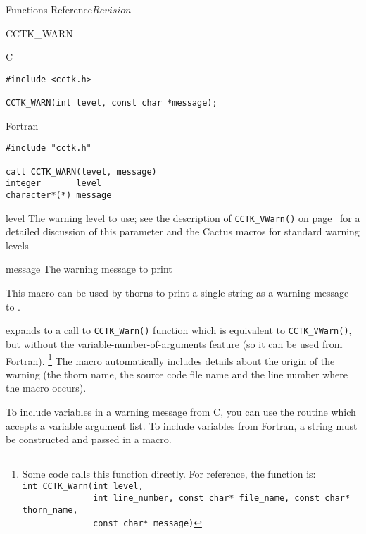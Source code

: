 \begin{cactuspart}{ Functions Reference}{}{$Revision$}
\begin{FunctionDescription}{CCTK\_WARN}
\begin{SynopsisSection}
\begin{Synopsis}{C}
\begin{verbatim}
#include <cctk.h>

CCTK_WARN(int level, const char *message);
\end{verbatim}
\end{Synopsis}
\begin{Synopsis}{Fortran}
\begin{verbatim}
#include "cctk.h"

call CCTK_WARN(level, message)
integer       level
character*(*) message
\end{verbatim}
\end{Synopsis}
\end{SynopsisSection}

\begin{ParameterSection}
\begin{Parameter}{level}
The warning level to use;
see the description of \verb|CCTK_VWarn()| on page~\pageref{CCTK-VInfo}
for a detailed discussion of this parameter and the Cactus macros
for standard warning levels
\end{Parameter}
\begin{Parameter}{message}
The warning message to print
\end{Parameter}
\end{ParameterSection}

\begin{Discussion}
This macro can be used by thorns to print a single string as a warning message
to .

 expands to a call to \verb|CCTK_Warn()| 
function which is equivalent to \verb|CCTK_VWarn()|, but without the
variable-number-of-arguments feature (so it can be used from Fortran).%
\footnote{%
         Some code calls this function directly.
         For reference, the function is:\\
         \texttt{\hbox{}int CCTK\_Warn(int level,}\\
         \texttt{\hbox{}~~~~~~~~~~~~~~int line\_number, const char* file\_name, const char* thorn\_name,}\\
         \texttt{\hbox{}~~~~~~~~~~~~~~const char* message)}
         }%
{}  The macro automatically includes details about the origin of the warning
(the thorn name, the source code file name and the line number where the macro
occurs).

To include variables in a warning message from C, you can use the routine
 which accepts a variable argument list.
To include variables from Fortran, a string must be constructed and passed
in a  macro.
\end{Discussion}


\end{FunctionDescription}
\end{cactuspart}
